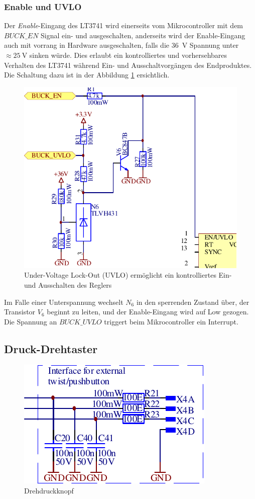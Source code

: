 \subsubsection*{Enable und UVLO}

Der \emph{Enable}-Eingang des LT3741 wird einerseits vom Mikrocontroller mit dem
$BUCK\_EN$  Signal ein- und ausgeschalten, anderseits  wird  der  Enable-Eingang
auch mit vorrang in Hardware ausgeschalten, falls  die  \SI{36}{\volt}  Spannung
unter $\approx  \SI{25}{\volt}$  sinken w\"urde. Dies erlaubt ein kontrolliertes
und vorhersehbares Verhalten  des LT3741 w\"ahrend Ein- und Ausschaltvorg\"angen
des Endproduktes. Die Schaltung dazu ist in der Abbildung \ref{fig:circuit:uvlo}
ersichtlich.

\begin{figure}[th!]
    \center
    \includegraphics[width=.6\textwidth]{images/circuit/uvlo.pdf}
    \caption{Under-Voltage Lock-Out (UVLO) erm\"oglicht ein kontrolliertes Ein- und Ausschalten des Reglers}
    \label{fig:circuit:uvlo}
\end{figure}

Im Falle einer Unterspannung  wechselt  $N_6$  in den sperrenden Zustand \"uber,
der  Transistor $V_6$ beginnt zu leiten, und der  Enable-Eingang  wird  auf  Low
gezogen.  Die  Spannung  an  $BUCK\_UVLO$  triggert  beim  Mikrocontroller   ein
Interrupt.

\subsection{Druck-Drehtaster}

\begin{figure}[th!]
    \center
    \includegraphics[width=.4\textwidth]{images/circuit/pushbutton.pdf}
    \caption{Drehdruckknopf}
    \label{fig:circuit:pushbutton}
\end{figure}


